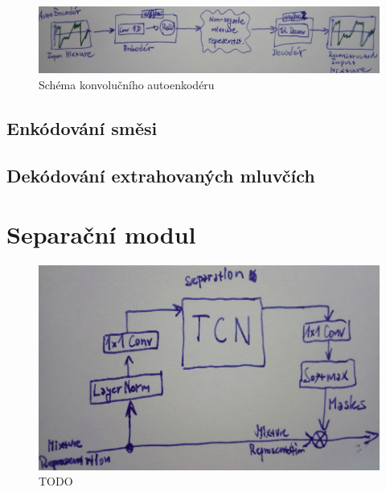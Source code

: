 \begin{figure}[H]
    \centering
    \includegraphics[scale=0.5]{obrazky-figures/autoenkoder.png}
    \caption{\label{fig:tasnet-autoenkoder}Schéma konvolučního autoenkodéru}
\end{figure}



\subsection{Enkódování směsi}


\subsection{Dekódování extrahovaných mluvčích}



\section{Separační modul}

\begin{figure}[H]
    \centering
    \includegraphics[scale=0.35]{obrazky-figures/separation_module_scheme.png}
    \caption{\label{fig:tasnet-autoenkoder}TODO}
\end{figure}


